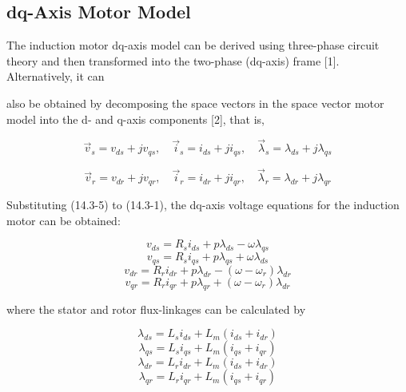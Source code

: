 \documentclass[letterpaper,12pt]{article}
\begin{document}
\subsection{dq-Axis Motor Model}

The induction motor dq-axis model can be derived using three-phase circuit theory and then transformed into the two-phase (dq-axis) frame [1]. Alternatively, it can

also be obtained by decomposing the space vectors in the space vector motor model into the d- and q-axis components [2], that is,

\begin{equation}
\vec{v}_s = v_{ds} + jv_{qs}, \quad \vec{i}_s = i_{ds} + ji_{qs}, \quad \vec{\lambda}_s = \lambda_{ds} + j\lambda_{qs} \tag{14.3-5}
\end{equation}

\begin{equation}
\vec{v}_r = v_{dr} + jv_{qr}, \quad \vec{i}_r = i_{dr} + ji_{qr}, \quad \vec{\lambda}_r = \lambda_{dr} + j\lambda_{qr} \tag{14.3-5}
\end{equation}

Substituting (14.3-5) to (14.3-1), the dq-axis voltage equations for the induction motor can be obtained:

\begin{equation}
v_{ds} = R_s i_{ds} + p\lambda_{ds} - \omega \lambda_{qs} \tag{14.3-6}
\end{equation}
\begin{equation}
v_{qs} = R_s i_{qs} + p\lambda_{qs} + \omega \lambda_{ds} \tag{14.3-6}
\end{equation}
\begin{equation}
v_{dr} = R_r i_{dr} + p\lambda_{dr} - (\omega - \omega_r)\lambda_{dr} \tag{14.3-6}
\end{equation}
\begin{equation}
v_{qr} = R_r i_{qr} + p\lambda_{qr} + (\omega - \omega_r)\lambda_{dr} \tag{14.3-6}
\end{equation}

where the stator and rotor flux-linkages can be calculated by

\begin{equation}
\lambda_{ds} = L_s i_{ds} + L_m (i_{ds} + i_{dr}) \tag{14.3-7}
\end{equation}
\begin{equation}
\lambda_{qs} = L_s i_{qs} + L_m (i_{qs} + i_{qr}) \tag{14.3-7}
\end{equation}
\begin{equation}
\lambda_{dr} = L_r i_{dr} + L_m (i_{ds} + i_{dr}) \tag{14.3-7}
\end{equation}
\begin{equation}
\lambda_{qr} = L_r i_{qr} + L_m (i_{qs} + i_{qr}) \tag{14.3-7}
\end{equation}
\end{document}
